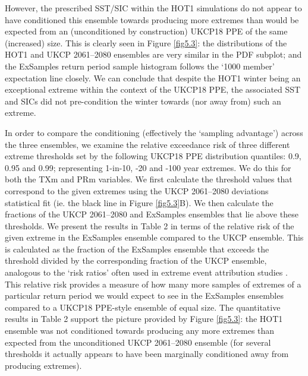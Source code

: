       However, the prescribed SST/SIC within the HOT1 simulations do not appear to have conditioned this ensemble towards producing more extremes than would be expected from an (unconditioned by construction) UKCP18 PPE of the same (increased) size. This is clearly seen in Figure \ref{fig5.3}: the distributions of the HOT1 and UKCP 2061--2080 ensembles are very similar in the PDF subplot; and the ExSamples return period sample histogram follows the `1000 member' expectation line closely. We can conclude that despite the HOT1 winter being an exceptional extreme within the context of the UKCP18 PPE, the associated SST and SICs did not pre-condition the winter towards (nor away from) such an extreme.
      
      In order to compare the conditioning (effectively the `sampling advantage') across the three ensembles, we examine the relative exceedance risk of three different extreme thresholds set by the following UKCP18 PPE distribution quantiles: 0.9, 0.95 and 0.99; representing 1-in-10, -20 and -100 year extremes. We do this for both the TXm and PRm variables. We first calculate the threshold values that correspond to the given extremes using the UKCP 2061--2080 deviations statistical fit (ie. the black line in Figure \ref{fig5.3}B). We then calculate the fractions of the UKCP 2061--2080 and ExSamples ensembles that lie above these thresholds. We present the results in Table 2 in terms of the relative risk of the given extreme in the ExSamples ensemble compared to the UKCP ensemble. This is calculated as the fraction of the ExSamples ensemble that exceeds the threshold divided by the corresponding fraction of the UKCP ensemble, analogous to the `risk ratios' often used in extreme event attribution studies \citep{stone_end--end_2005,stott_human_2004}. This relative risk provides a measure of how many more samples of extremes of a particular return period we would expect to see in the ExSamples ensembles compared to a UKCP18 PPE-style ensemble of equal size. The quantitative results in Table 2 support the picture provided by Figure \ref{fig5.3}: the HOT1 ensemble was not conditioned towards producing any more extremes than expected from the unconditioned UKCP 2061--2080 ensemble (for several thresholds it actually appears to have been marginally conditioned away from producing extremes).
      
